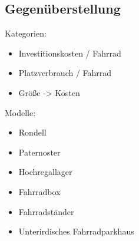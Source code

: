 \subsection{Gegenüberstellung}

Kategorien:
\begin{itemize}
  \item Investitionskosten / Fahrrad
  \item Platzverbrauch / Fahrrad
  \item Größe -> Kosten
\end{itemize}

Modelle:
\begin{itemize}
  \item Rondell
  \item Paternoster
  \item Hochregallager
  \item Fahrradbox
  \item Fahrradständer
  \item Unterirdisches Fahrradparkhaus
\end{itemize}